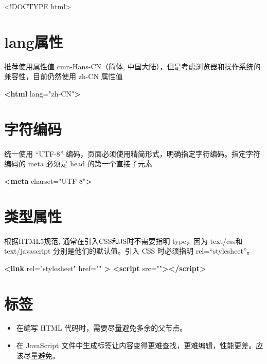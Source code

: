 \documentclass[]{report}
\newenvironment{Shaded}{}{}
\newcommand{\DataTypeTok}[1]{\textcolor[rgb]{0.56,0.13,0.00}{#1}}
\newcommand{\KeywordTok}[1]{\textcolor[rgb]{0.00,0.44,0.13}{\textbf{#1}}}
\newcommand{\NormalTok}[1]{#1}
\newcommand{\OtherTok}[1]{\textcolor[rgb]{0.00,0.44,0.13}{#1}}
\newcommand{\StringTok}[1]{\textcolor[rgb]{0.25,0.44,0.63}{#1}}
\providecommand{\tightlist}{%
  \setlength{\itemsep}{0pt}\setlength{\parskip}{0pt}}
\begin{document}
\begin{Shaded}
\begin{Highlighting}[]
    \DataTypeTok{<!DOCTYPE }\NormalTok{html}\DataTypeTok{>}
\end{Highlighting}
\end{Shaded}

\hypertarget{langux5c5eux6027}{%
\section{lang属性}\label{langux5c5eux6027}}

推荐使用属性值 cmn-Hans-CN（简体,
中国大陆），但是考虑浏览器和操作系统的兼容性，目前仍然使用 zh-CN 属性值

\begin{Shaded}
\begin{Highlighting}[]
    \KeywordTok{<html}\OtherTok{ lang=}\StringTok{"zh-CN"}\KeywordTok{>}
\end{Highlighting}
\end{Shaded}

\hypertarget{ux5b57ux7b26ux7f16ux7801}{%
\section{字符编码}\label{ux5b57ux7b26ux7f16ux7801}}

统一使用 ``UTF-8''
编码，页面必须使用精简形式，明确指定字符编码。指定字符编码的 meta 必须是
head 的第一个直接子元素

\begin{Shaded}
\begin{Highlighting}[]
    \KeywordTok{<meta}\OtherTok{ charset=}\StringTok{"UTF-8"}\KeywordTok{>}
\end{Highlighting}
\end{Shaded}

\hypertarget{ux7c7bux578bux5c5eux6027}{%
\section{类型属性}\label{ux7c7bux578bux5c5eux6027}}

根据HTML5规范, 通常在引入CSS和JS时不需要指明 type，因为 text/css和
text/javascript 分别是他们的默认值。引入 CSS 时必须指明
rel=``stylesheet''。

\begin{Shaded}
\begin{Highlighting}[]
    \KeywordTok{<link}\OtherTok{ rel=}\StringTok{"stylesheet"}\OtherTok{ href=}\StringTok{""} \KeywordTok{>}
    \KeywordTok{<script}\OtherTok{ src=}\StringTok{""}\KeywordTok{></script>}
\end{Highlighting}
\end{Shaded}

\hypertarget{ux6807ux7b7e}{%
\section{标签}\label{ux6807ux7b7e}}

\begin{itemize}
\tightlist
\item
  在编写 HTML 代码时，需要尽量避免多余的父节点。
\item
  在 JavaScript
  文件中生成标签让内容变得更难查找，更难编辑，性能更差。应该尽量避免。
\end{itemize}
\end{document}
